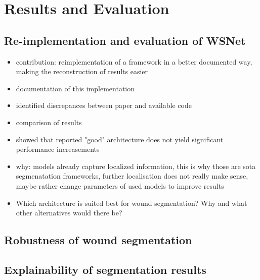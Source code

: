 \section{Results and Evaluation}

\subsection{Re-implementation and evaluation of WSNet}

\begin{itemize}
	\item contribution: reimplementation of a framework in a better documented way, making the reconstruction of results easier
	\item documentation of this implementation
	\item identified discrepances between paper and available code
	\item comparison of results
	\item showed that reported "good" architecture does not yield significant performance increasements
	\item why: models already capture localized information, this is why those are sota segmenatation frameworks, further localisation does not really make sense, maybe rather change parameters of used models to improve results
	\item Which architecture is suited best for wound segmentation? Why and what other alternatives would there be?
\end{itemize}

\subsection{Robustness of wound segmentation}



\subsection{Explainability of segmentation results}